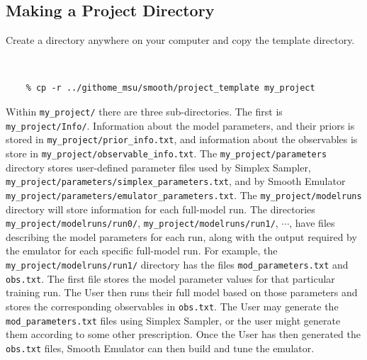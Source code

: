 \documentclass[main.tex]{subfiles}
\begin{document}
\subsection{Making a Project Directory}

Create a directory anywhere on your computer and copy the template directory.
{\tt 
\begin{verbatim}
    % cp -r ../githome_msu/smooth/project_template my_project
\end{verbatim}
}
Within {\tt my\_project/} there are three sub-directories. The first is {\tt my\_project/Info/}. Information about the model parameters, and their priors is stored in {\tt my\_project/prior\_info.txt}, and information about the observables is store in {\tt my\_project/observable\_info.txt}. The {\tt my\_project/parameters} directory stores user-defined parameter files used by Simplex Sampler, {\tt my\_project/parameters/simplex\_parameters.txt}, and by Smooth Emulator {\tt my\_project/parameters/emulator\_parameters.txt}. The {\tt my\_project/modelruns} directory will store information for each full-model run. The directories
{\tt  my\_project/modelruns/run0/}, {\tt  my\_project/modelruns/run1/}, $\cdots$, have files describing the model parameters for each run, along with the output required by the emulator for each specific full-model run. For example, the {\tt  my\_project/modelruns/run1/} directory has the files {\tt mod\_parameters.txt} and {\tt obs.txt}. The first file stores the model parameter values for that particular training run. The User then runs their full model based on those parameters and stores the corresponding observables in {\tt obs.txt}. The User may generate the {\tt mod\_parameters.txt} files using Simplex Sampler, or the user might generate them according to some other prescription. Once the User has then generated the {\tt obs.txt} files, Smooth Emulator can then build and tune the emulator.
\end{document}
